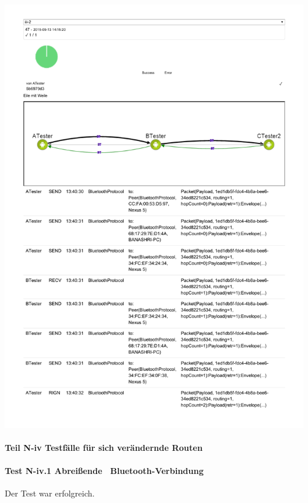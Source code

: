 \includegraphics[trim=0 200 0 0,clip,scale=0.8]{belege/manuelle-tests/netzwerk/Dashboardauszuege/Netzwerktest_n-iii-2.pdf}
\clearpage


\paragraph{Teil N-iv Testfälle für sich verändernde Routen}

\paragraph{Test N-iv.1 \glqq Abreißende\grqq~ Bluetooth-Verbindung}

Der Test war erfolgreich.

